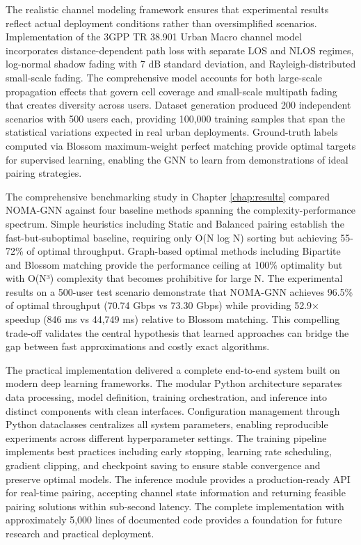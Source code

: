 The realistic channel modeling framework ensures that experimental results reflect actual deployment conditions rather than oversimplified scenarios. Implementation of the 3GPP TR 38.901 Urban Macro channel model incorporates distance-dependent path loss with separate LOS and NLOS regimes, log-normal shadow fading with 7 dB standard deviation, and Rayleigh-distributed small-scale fading. The comprehensive model accounts for both large-scale propagation effects that govern cell coverage and small-scale multipath fading that creates diversity across users. Dataset generation produced 200 independent scenarios with 500 users each, providing 100,000 training samples that span the statistical variations expected in real urban deployments. Ground-truth labels computed via Blossom maximum-weight perfect matching provide optimal targets for supervised learning, enabling the GNN to learn from demonstrations of ideal pairing strategies.

The comprehensive benchmarking study in Chapter \ref{chap:results} compared NOMA-GNN against four baseline methods spanning the complexity-performance spectrum. Simple heuristics including Static and Balanced pairing establish the fast-but-suboptimal baseline, requiring only O(N log N) sorting but achieving 55-72\% of optimal throughput. Graph-based optimal methods including Bipartite and Blossom matching provide the performance ceiling at 100\% optimality but with O(N³) complexity that becomes prohibitive for large N. The experimental results on a 500-user test scenario demonstrate that NOMA-GNN achieves 96.5\% of optimal throughput (70.74 Gbps vs 73.30 Gbps) while providing 52.9× speedup (846 ms vs 44,749 ms) relative to Blossom matching. This compelling trade-off validates the central hypothesis that learned approaches can bridge the gap between fast approximations and costly exact algorithms.

The practical implementation delivered a complete end-to-end system built on modern deep learning frameworks. The modular Python architecture separates data processing, model definition, training orchestration, and inference into distinct components with clean interfaces. Configuration management through Python dataclasses centralizes all system parameters, enabling reproducible experiments across different hyperparameter settings. The training pipeline implements best practices including early stopping, learning rate scheduling, gradient clipping, and checkpoint saving to ensure stable convergence and preserve optimal models. The inference module provides a production-ready API for real-time pairing, accepting channel state information and returning feasible pairing solutions within sub-second latency. The complete implementation with approximately 5,000 lines of documented code provides a foundation for future research and practical deployment.

